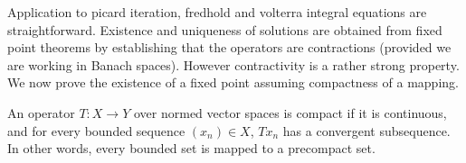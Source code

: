 Application to picard iteration, fredhold and volterra integral equations are straightforward. Existence and uniqueness of solutions are obtained from fixed point theorems by establishing that the operators are contractions (provided we are working in Banach spaces). However contractivity is a rather strong property. We now prove the existence of a fixed point assuming compactness of a mapping.

\begin{definition}
    An operator $T:X\rightarrow Y$ over normed vector spaces is compact if it is continuous, and for every bounded sequence $(x_n)\in X$, $Tx_n$ has a convergent subsequence. In other words, every bounded set is mapped to a precompact set.
\end{definition}